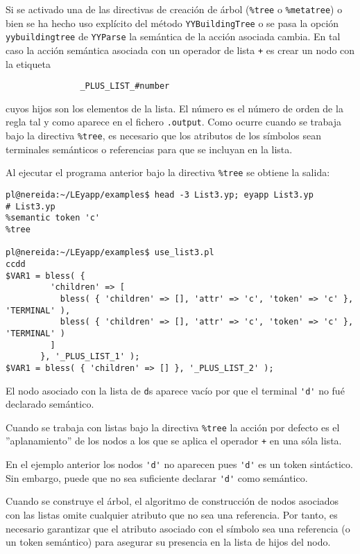 Si se activado una de las directivas de creación de árbol (\verb|%tree| o \verb|%metatree|)
o bien se ha hecho uso explícito del método \verb|YYBuildingTree| o se pasa la 
opción \verb|yybuildingtree| de \verb|YYParse| la semántica de la acción 
asociada cambia.
En tal caso la acción semántica asociada con un operador de lista \verb|+| es crear un nodo
con la etiqueta 

\verb|               _PLUS_LIST_#number| 


cuyos hijos son los elementos
de la lista. El número es el número de orden de la regla tal y como 
aparece en el fichero \verb|.output|. Como ocurre cuando se trabaja bajo la 
directiva \verb|%tree|, es necesario que los atributos de los
símbolos sean terminales semánticos
o referencias para que se incluyan en la lista. 

Al ejecutar el programa anterior bajo la directiva \verb|%tree| se obtiene la salida:

\begin{verbatim}
pl@nereida:~/LEyapp/examples$ head -3 List3.yp; eyapp List3.yp
# List3.yp
%semantic token 'c'
%tree

pl@nereida:~/LEyapp/examples$ use_list3.pl
ccdd
$VAR1 = bless( {
         'children' => [
           bless( { 'children' => [], 'attr' => 'c', 'token' => 'c' }, 'TERMINAL' ),
           bless( { 'children' => [], 'attr' => 'c', 'token' => 'c' }, 'TERMINAL' )
         ]
       }, '_PLUS_LIST_1' );
$VAR1 = bless( { 'children' => [] }, '_PLUS_LIST_2' );
\end{verbatim}

El nodo asociado con la lista de \verb|d|s aparece vacío por que el terminal
\verb|'d'| no fué declarado semántico. 


Cuando se trabaja con listas bajo la directiva \verb|%tree|
la acción por defecto es el ''aplanamiento'' de los nodos
a los que se aplica el operador \verb|+| en una sóla lista.

En el ejemplo anterior los nodos \verb|'d'| no aparecen pues 
\verb|'d'| es un token sintáctico. Sin embargo, puede que no 
sea suficiente declarar \verb|'d'| como semántico.

Cuando se construye el árbol, el algoritmo de construcción de nodos asociados con las listas 
omite cualquier atributo que no sea una referencia. Por tanto,
es necesario garantizar que el atributo asociado con el símbolo
sea una referencia (o un token semántico) para asegurar
su presencia en la lista de hijos del nodo.

